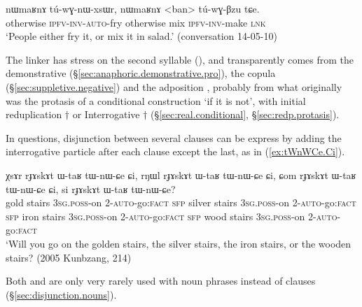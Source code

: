 \begin{exe}
\ex \label{ex:nWmaRnA.tuwGnWxsWr}
\gll nɯmaʁnɤ tú-wɣ-nɯ-xsɯr, nɯmaʁnɤ <ban> tú-wɣ-βzu tɕe. \\
otherwise \textsc{ipfv}-\textsc{inv}-\textsc{auto}-fry otherwise mix \textsc{ipfv}-\textsc{inv}-make \textsc{lnk} \\
\glt `People either fry it, or mix it in salad.' (conversation 14-05-10)
\end{exe} 

The linker  has stress on the second syllable (), and transparently comes from the demonstrative  (§\ref{sec:anaphoric.demonstrative.pro}), the copula  (§\ref{sec:suppletive.negative}) and the adposition , probably from what originally was the protasis of a conditional construction `if it is not', with initial reduplication $\dagger$ or Interrogative $\dagger$ (§\ref{sec:real.conditional}, §\ref{sec:redp.protasis}). 

In questions, disjunction between several clauses can be express by adding the interrogative particle  after each clause except the last, as in (\ref{ex:tWnWCe.Ci}).

\begin{exe}
\ex \label{ex:tWnWCe.Ci}
\gll χsɤr rɟɤskɤt ɯ-taʁ tɯ-nɯ-ɕe ɕi, rŋɯl rɟɤskɤt ɯ-taʁ tɯ-nɯ-ɕe ɕi, ɕom rɟɤskɤt ɯ-taʁ tɯ-nɯ-ɕe ɕi, 
si rɟɤskɤt ɯ-taʁ tɯ-nɯ-ɕe? \\
gold stairs \textsc{3sg}.\textsc{poss}-on 2-\textsc{auto}-go:\textsc{fact} \textsc{sfp} silver stairs \textsc{3sg}.\textsc{poss}-on 2-\textsc{auto}-go:\textsc{fact} \textsc{sfp} iron stairs \textsc{3sg}.\textsc{poss}-on 2-\textsc{auto}-go:\textsc{fact} \textsc{sfp} wood stairs \textsc{3sg}.\textsc{poss}-on 2-\textsc{auto}-go:\textsc{fact} \\
\glt `Will you go on the golden stairs, the silver stairs, the iron stairs, or the wooden stairs? (2005 Kunbzang, 214)
\end{exe} 

Both  and  are only very rarely used with noun phrases instead of clauses (§\ref{sec:disjunction.nouns}).

